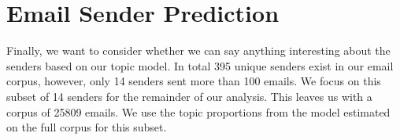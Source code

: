 \documentclass[12pt]{article}
\theoremstyle{definition}
\theoremstyle{algodesc}
\begin{document}
\section{Email Sender Prediction}

Finally, we want to consider whether we can say anything interesting about the senders based on our topic model.  In total 395 unique senders exist in our email corpus, however, only 14 senders sent more than 100 emails.  We focus on this subset of 14 senders for the remainder of our analysis.  This leaves us with a corpus of 25809 emails.  We use the topic proportions from the model estimated on the full corpus for this subset.

\begin{table}[h]
\centering
\label{topic_sources}
\caption{Primary senders for interesting topics}
\label{tab:top_senders}
\end{table}
\end{document}

